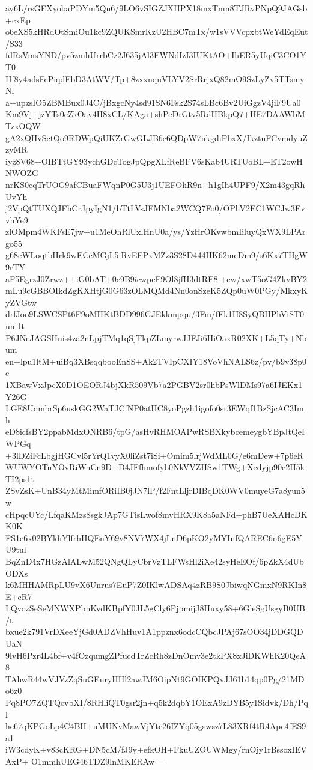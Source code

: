 ay6L/rsGEXyobaPDYm5Qn6/9LO6vSIGZJXHPX18mxTmn8TJRvPNpQ9JAGsb+cxEp
o6eXS5kHRdOtSmiOu1kc9ZQUKSmrKzU2HBC7mTx/w1sVVVcpxbtWeYdEqEut/S33
fdRsVmsYND/pv5zmhUrrbCz2J635jAl3EWNdIzI3IUKtAO+IhER5yUqiC3CO1YT0
Hf8y4adsFcPiqdFbD3AtWV/Tp+8zxxnquVLYV2SrRrjxQ82mO9SzLyZv5TTsmyNl
a+upzsIO5ZBMBux0J4C/jBxgcNy4sd91SN6Fsk2S74sLBc6Bv2UiGgzV4jiF9Ua0
Km9Vj+jzYTs0cZkOav4H8xCL/KAga+shPeDrGtv5RdHBkpQ7+HE7DAAWbMTzxOQW
gA2xQHvSctQo9RDWpQiUKZrGwGLJB6e6QDpW7nkgdiPbxX/IkztuFCvmdyuZzyMR
iyz8V68+OIBTtGY93ychGDcTogJpQpgXLfReBFV6sKab4URTUoBL+ET2owHNWOZG
nrKS0cqTrUOG9afCBuaFWqnP0G5U3j1UEFOhR9n+h1gIh4UPF9/X2m43gqRhUvYh
j2VpQtTUXQJFhCrJpyIgN1/bTtLVsJFMNba2WCQ7Fo0/OPhV2EC1WCJw3EvvhYe9
zlOMpm4WKFsE7jw+u1MeOhRlUxlHnU0a/ys/YzHrOKvwbmIiluyQxWX9LPArgo55
g68cWLoqtbHrk9wECcMGjL5iRvEFPxMZz3S28D444HK62meDm9/s6Kx7THgW9rTY
aF5EgrzJ0Zrwz++iG0bAT+0e9B9icwpcF9Ol8jfH3dtRE8i+cw/xwT5oG4ZkvBY2
mLu9cGBBOIkdZgKXHtjG0G63zOLMQMd4Nn0onSzeK5ZQp0uW0PGy/MkxyKyZVGtw
drfJoo9LSWCSPt6F9oMHKtBDD996GJEkkmpqu/3Fm/fFk1H8SyQBHPhViST0um1t
P6JNeJAGSHuis4za2nLpjTMq1qSjTkpZLmyrwJJFJi6HiOaxR02XK+L5qTy+Nbum
en+lpu1ltM+uiBq3XBsqqbooEnSS+Ak2TVIpCXIY18VoVhNALS6z/pv/b9v38p0c
1XBawVxJpcX0D1OEORJ4bjXkR509Vb7a2PGBV2sr0hbPsWlDMs97a6IJEKx1Y26G
LGE8UqmbrSp6uskGG2WaTJCfNP0atHC8yoPgzh1igofo0sr3EWqf1BzSjcAC3Imh
eD8icfsBY2ppabMdxONRB6/tpG/asHvRHMOAPwRSBXkybcemeygbYBpJtQeIWPGq
+3lDZiFcLbgjHGCvl5rYrQ1vyX0liZst7iSi+Omim5lrjWdML0G/e6mDew+7p6eR
WUWYOTnYOvRiWnCn9D+D4JFfhmofyb0NkVVZHSw1TWg+Xedyjp90c2H5kTI2ps1t
ZSvZsK+UnB34yMtMimfORiIB0jJN7lP/f2FntLljrDIBqDK0WV0muyeG7a8yun5w
cHpqcUYc/LfqaKMzs8sgkJAp7GTisLwof8mvHRX9K8a5aNFd+phB7UeXAHcDKK0K
FS1e6x02BYkhYlfrhHQEnY69v8NV7WX4jLnD6pKO2yMYInfQAREC6n6gE5YU9tul
BqZnD4x7HGzAlALwM52QNgQLyCbrVzTLFWsHl2iXe42syHeEOf/6pZkX4dUbODXs
k6MHHAMRpLU9vX6Unrus7EuP7Z0IKlwADSAq4zRB9S0JbiwqNGmxN9RKIn8E+cR7
LQvozSeSeMNWXPbnKvdKBpfY0JL5gCly6PjpmijJ8Huxy58+6GleSgUsgyB0UB/t
bxue2k791VrDXeeYjGd0ADZVhHuv1A1ppznx6odcCQbcJPAj67sOO34jDDGQDUaN
9lvH6Pzr4L4bf+v4fOzqumgZPfucdTrZcRh8zDnOmv3e2tkPX8xJiDKWhK20QeA8
TAhwR44wVJVzZqSuGEuryHHl2awJM6OipNt9GOIKPQvJJ61b14qp0Pg/21MDo6z0
Pq8PO7ZQTQcvbXI/8RHliQT0gsr2jn+q5k2dqbY1OExA9zDYB5y1Sidvk/Dh/Pql
he67qKPGoLp4C4BH+uMUNvMawVjYte26IZYq05gswsz7L83XRf4tR4Apc4fES9a1
iW3cdyK+v83cKRG+DN5cM/fJ9y+efkOH+FkuUZOUWMgy/rnOjy1rBssoxIEVAxP+
O1mmhUEG46TDZ9lnMKERAw==
